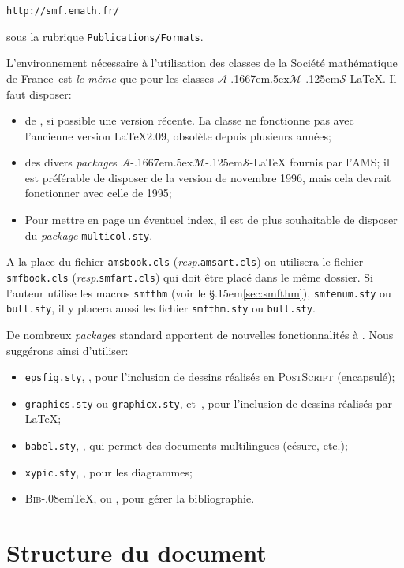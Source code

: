 \documentclass[11pt,francais]{smfart}
\newcommand{\SmF}{Soci\'et\'e ma\-th\'e\-ma\-ti\-que de France}
\newcommand{\BibTeX}{{\scshape Bib}\kern-.08em\TeX}
\newcommand{\T}{\S\kern .15em\relax }
\newcommand{\AMS}{$\mathcal{A}$\kern-.1667em\lower.5ex\hbox
        {$\mathcal{M}$}\kern-.125em$\mathcal{S}$}
\newcommand{\resp}{\emph{resp}.\xspace}
\begin{document}
\texttt{http://smf.emath.fr/}

\noindent sous la rubrique \verb|Publications/Formats|.

\smallskip
L'environnement n\'ecessaire \`a l'utilisation des classes de la \SmF\ est
{\em le m\^eme} que pour les classes {\AMS-\LaTeX}. Il faut disposer: 
\begin{itemize}
\item de \LaTeXe, si possible une version r\'ecente. La classe
ne fonctionne pas avec l'ancienne version \LaTeX 2.09,
obsol\`ete depuis plusieurs ann\'ees;
\item des divers {\em package}s {\AMS-\LaTeX} fournis par l'AMS;
il est pr\'ef\'erable de disposer de la version de novembre 1996,
mais cela devrait fonctionner avec celle de 1995;
\item
Pour mettre en page un \'eventuel index,
il est de plus souhaitable de disposer du {\em package}
\texttt{multicol.sty}.
\end{itemize}
A la place du fichier \texttt{amsbook.cls} (\resp \texttt{amsart.cls}) on
utilisera le fichier \texttt{smfbook.cls} (\resp \texttt{smfart.cls}) qui
doit \^etre plac\'e dans le m\^eme dossier. Si l'auteur utilise les macros
\texttt{smfthm} (voir le \T\ref{sec:smfthm}), \texttt{smfenum.sty} ou \texttt{bull.sty}, il y placera aussi les fichier \texttt{smfthm.sty} ou \texttt{bull.sty}. 

\smallskip
De nombreux {\em package}s standard apportent
de nouvelles fonctionnalit\'es \`a \LaTeXe. Nous sugg\'erons ainsi
d'utiliser:
\begin{itemize}
\item \texttt{epsfig.sty}, \cite{epsfig},
pour l'inclusion de dessins r\'ealis\'es
en {\scshape PostScript} (encapsul\'e);
\item \texttt{graphics.sty} ou \texttt{graphicx.sty},
\cite{graphics} et~\cite{graphicx}, pour
l'inclusion de dessins r\'ealis\'es par \LaTeX{};
\item \texttt{babel.sty}, \cite{babel},
qui permet des documents multilingues (c\'esure, etc.);
\item \texttt{xypic.sty},
\cite{xypic}, pour les diagrammes;
\item {\BibTeX}, \cite[Appendix B]{lamport94} ou \cite{hypatia},
 pour g\'erer la bibliographie.
\end{itemize}


\section{Structure du document}\label{sec:struct}
\end{document}
